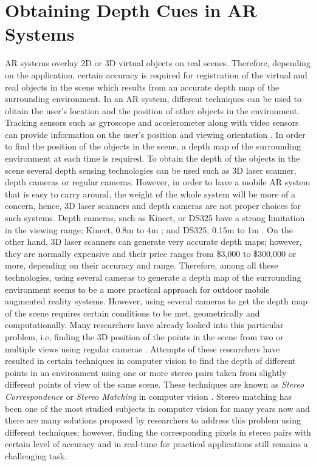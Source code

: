 \section{Obtaining Depth Cues in AR Systems}
AR systems overlay 2D or 3D virtual objects on real scenes. Therefore, depending on the application, certain accuracy is required for 
registration of the virtual and real objects in the scene which results from an accurate depth map of the surrounding environment.
In an AR system, different techniques can be used to 
obtain the user's location and the position of other objects in the environment.
Tracking sensors such as gyroscope and accelerometer along with video sensors can provide information on the user's position and viewing orientation \cite{azuma01}.
In order to find the position of the objects in the scene, a depth map of the surrounding environment at each time is required. To obtain the depth of the 
objects in the scene several depth sensing technologies can be used such as 3D laser scanner, depth cameras or regular cameras. However, in order to have a mobile AR
system that is easy to carry around, the weight of the whole system will be more of a concern, hence, 
3D laser scanners and depth cameras are not proper choices for such systems.
Depth cameras, such as Kinect, or DS325 have a strong limitation in the viewing range; Kinect, 0.8m to 4m \cite{mkinect}; and DS325, 0.15m to 1m \cite{skinetic}. 
On the other hand, 3D laser scanners can
generate very accurate depth maps; however, they are normally expensive and their price ranges from \$3,000 to \$300,000 or more, 
depending on their accuracy and range.
Therefore, among all these technologies, using several 
cameras to generate a depth map of the surrounding environment seems to be a more practical approach for outdoor mobile augmented reality systems. {\newline}
However, using several cameras to get the depth map of the scene requires certain conditions to be met, geometrically and computationally. Many researchers have already looked into
this particular problem, i.e, finding the 3D position of the points in the scene from two or multiple views using regular cameras \cite{sze11}. Attempts of these researchers have resulted in
certain techniques in computer vision to find the depth of different points in an environment using one or more stereo pairs taken from slightly different points of view of the same scene.
These techniques are known as {\it Stereo Correspondence} or {\it Stereo Matching} in computer vision \cite{sze11}. Stereo matching has been one of the most studied subjects in computer vision for 
many years now and there are many solutions proposed by researchers to address this problem using different techniques; however, finding the corresponding pixels in stereo pairs with certain level of 
accuracy and in real-time for practical applications still remains a challenging task. {\newline}

